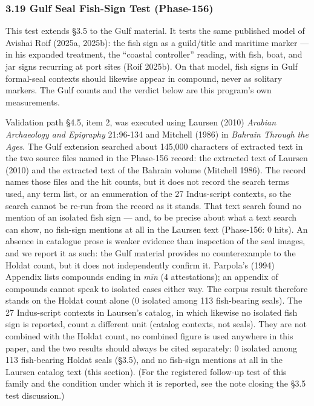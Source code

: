 \documentclass[
]{article}
\begin{document}
\subsubsection{3.19 Gulf Seal Fish-Sign Test
(Phase-156)}\label{gulf-seal-fish-sign-test-phase-156}

This test extends \S3.5 to the Gulf material. It tests the same
published model of Avishai Roif (2025a, 2025b): the fish sign as a
guild/title and maritime marker --- in his expanded treatment, the
``coastal controller'' reading, with fish, boat, and jar signs
recurring at port sites (Roif 2025b). On that model, fish signs in
Gulf formal-seal contexts should likewise appear in compound,
never as solitary markers. The Gulf counts and the verdict below
are this program's own measurements.

Validation path §4.5, item 2, was executed using Laursen (2010) \emph{Arabian
Archaeology and Epigraphy} 21:96-134 and Mitchell (1986) in
\emph{Bahrain Through the Ages}. The Gulf extension searched about 145,000 characters of extracted text in the two source files named in the Phase-156 record: the extracted text of Laursen (2010) and the extracted text of the Bahrain volume (Mitchell 1986). The record names those files and the hit counts, but it does not record the search terms used, any term list, or an enumeration of the 27 Indus-script contexts, so the search cannot be re-run from the record as it stands. That text search found no mention of an isolated fish sign --- and, to be precise about what a text search can show, no fish-sign mentions at all in the Laursen text (Phase-156: 0 hits). An absence in catalogue prose is weaker evidence than inspection of the seal images, and we report it as such: the Gulf material provides no counterexample to the Holdat count, but it does not independently confirm it. Parpola's (1994) Appendix lists compounds ending in \emph{mīn} (4 attestations); an appendix of compounds cannot speak to isolated cases either way. The corpus result therefore stands on the Holdat count alone (0 isolated among 113 fish-bearing seals). The 27 Indus-script contexts in Laursen's catalog, in which likewise no isolated fish sign is reported, count a different unit (catalog contexts, not seals). They are not combined with the Holdat count, no combined figure is used anywhere in this paper, and the two results should always be cited separately: 0 isolated among 113 fish-bearing Holdat seals (§3.5), and no fish-sign mentions at all in the Laursen catalog text (this section). (For the registered follow-up test of this family and the condition under which it is reported, see the note closing the §3.5 test discussion.)
\end{document}
